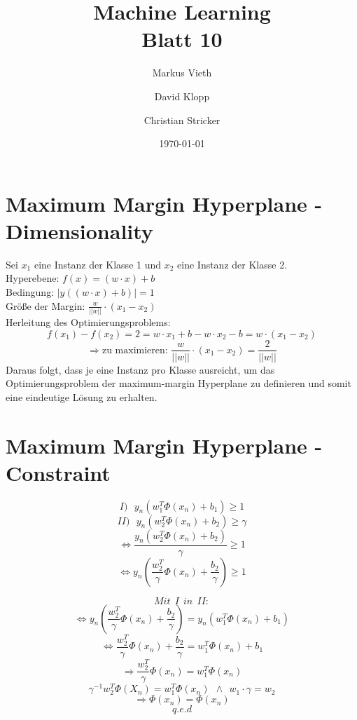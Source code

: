 \documentclass[a4paper,11pt,twoside]{scrartcl}
\title{Machine Learning\\ Blatt 10}
\author{Markus Vieth\and David Klopp\and Christian Stricker}
\date{\today}
\begin{document}
\newcommand{\cor}[1]{\textcolor{red}{\textit{#1}}}
\maketitle
\cleardoublepage
\pagestyle{myheadings}

\newpage

\section*{Maximum Margin Hyperplane - Dimensionality}
Sei $x_1$ eine Instanz der Klasse 1 und $x_2$ eine Instanz der Klasse 2.\\
Hyperebene: $f(x) = (w\cdot x) + b$\\
Bedingung: $|y((w\cdot x) +b)| = 1$\\
Größe der Margin: $\frac{w}{||w||} \cdot (x_1 - x_2)$\\
Herleitung des Optimierungsproblems:
\[ f(x_1) - f(x_2) = 2 = w\cdot x_1 + b - w\cdot x_2 - b = w\cdot(x_1-x_2) \]
\[ \Rightarrow \text{zu maximieren: }\frac{w}{||w||}\cdot(x_1 - x_2) = \frac{2}{||w||} \]
Daraus folgt, dass je eine Instanz pro Klasse ausreicht, um das Optimierungsproblem der maximum-margin Hyperplane zu definieren und somit eine eindeutige Lösung zu erhalten. 

\section*{Maximum Margin Hyperplane - Constraint}
\[I )~~~y_n (w_1^T \Phi(x_n) + b_1) \geq 1 \]
\[II)~~~y_n (w_2^T \Phi(x_n) + b_2) \geq \gamma \]
\[ \Leftrightarrow \frac{y_n (w_2^T \Phi(x_n) + b_2)}{\gamma} \geq 1 \]
\[ \Leftrightarrow y_n \left (\frac{w_2^T}{\gamma} \Phi(x_n) + \frac{b_2}{\gamma} \right) \geq 1 \]

\[Mit~~ I~~in ~~II: \]
\[ \Leftrightarrow y_n \left (\frac{w_2^T}{\gamma} \Phi(x_n) + \frac{b_2}{\gamma} \right) = y_n (w_1^T \Phi(x_n) + b_1) \]
\[ \Leftrightarrow \frac{w_2^T}{\gamma} \Phi(x_n) + \frac{b_2}{\gamma} = w_1^T \Phi(x_n) + b_1 \]
\[ \Rightarrow \frac{w_2^T}{\gamma} \Phi(x_n) = w_1^T \Phi(x_n) \]
\[ \gamma^{-1} w_2^T \Phi(X_n) = w_1^T \Phi(x_n)~~\land~~w_1 \cdot \gamma = w_2 \]
\[ \Rightarrow \Phi(x_n) = \Phi(x_n) \]
\[q.e.d\]
\end{document}
